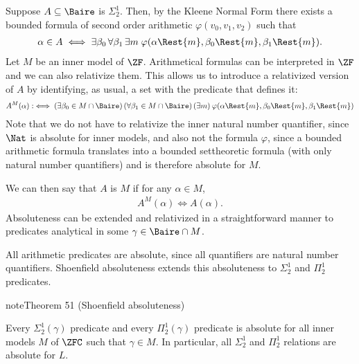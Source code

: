 \documentclass[letterpaper,10pt,english]{jupyterBook}
\begin{document}
\sphinxAtStartPar
Suppose \(A \subseteq \Baire\) is \(\Sigma^1_2\). Then, by the Kleene Normal Form there exists a bounded formula of second order arithmetic \(\varphi(v_0,v_1,v_2)\) such that
\begin{equation*}
\begin{split}
	\alpha \in A \iff \exists \beta_0 \, \forall \beta_1 \, \exists m \; \varphi(\alpha\Rest{m},\beta_0\Rest{m},\beta_1\Rest{m}).
\end{split}
\end{equation*}
\sphinxAtStartPar
Let \(M\) be an inner model of \(\ZF\). Arithmetical formulas can be interpreted in \(\ZF\) and we can also relativize them. This allows us to introduce a relativized version of \(A\) by identifying, as usual, a set with the predicate that defines it:
\begin{equation*}
\begin{split}
	A^M(\alpha) :\iff (\exists \beta_0 \in M\cap \Baire) \, (\forall \beta_1\in M \cap \Baire)  \, (\exists m) \: \varphi(\alpha\Rest{m},\beta_0\Rest{m},\beta_1\Rest{m})
\end{split}
\end{equation*}
\sphinxAtStartPar
Note that we do not have to relativize the inner natural number quantifier, since \(\Nat\) is absolute for inner models, and also not the formula \(\varphi\), since a bounded arithmetic formula translates into a bounded set\sphinxhyphen{}theoretic formula (with only natural number quantifiers) and is therefore absolute for \(M\).

\sphinxAtStartPar
We can then say that \(A\) is  \(M\) if for any \(\alpha\in M\),
\begin{equation*}
\begin{split}
	A^M(\alpha) \iff A(\alpha).
\end{split}
\end{equation*}
\sphinxAtStartPar
Absoluteness can be extended and relativized in a straightforward manner to predicates analytical in some \(\gamma \in \Baire \cap M\).

\sphinxAtStartPar
All arithmetic predicates are absolute, since all quantifiers are natural number quantifiers. Shoenfield absoluteness extends this absoluteness to \(\Sigma^1_2\) and \(\Pi^1_2\) predicates.
\label{shoenfield:thm-Shoenfild-absoluteness}
\begin{sphinxadmonition}{note}{Theorem 51 (Shoenfield absoluteness)}



\sphinxAtStartPar
Every \(\Sigma^1_2(\gamma)\) predicate and every \(\Pi^1_2(\gamma)\) predicate is absolute for all inner models \(M\) of \(\ZFC\) such that \(\gamma \in M\). In particular, all \(\Sigma^1_2\) and \(\Pi^1_2\) relations are absolute for \(L\).
\end{sphinxadmonition}
\end{document}
